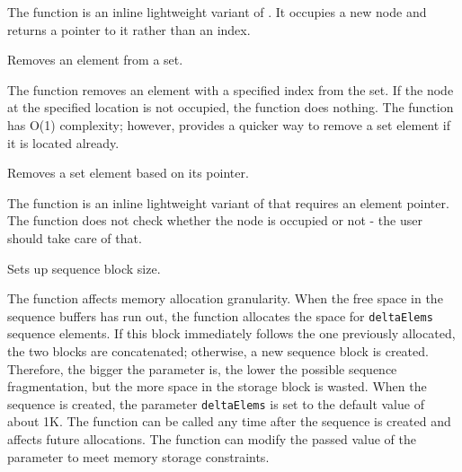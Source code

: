 \begin{description}
\end{description}

The function is an inline lightweight variant of . It occupies a new node and returns a pointer to it rather than an index.


Removes an element from a set.


\begin{description}
\end{description}

The function removes an element with a specified
index from the set. If the node at the specified location is not occupied,
the function does nothing. The function has O(1) complexity; however,
 provides a quicker way to remove a set element
if it is located already.

Removes a set element based on its pointer.


\begin{description}
\end{description}

The function is an inline lightweight variant of  that requires an element pointer. The function does not check whether the node is occupied or not - the user should take care of that.


Sets up sequence block size.


\begin{description}
\end{description}

The function affects memory allocation
granularity. When the free space in the sequence buffers has run out,
the function allocates the space for \texttt{deltaElems} sequence
elements. If this block immediately follows the one previously allocated,
the two blocks are concatenated; otherwise, a new sequence block is
created. Therefore, the bigger the parameter is, the lower the possible
sequence fragmentation, but the more space in the storage block is wasted. When
the sequence is created, the parameter \texttt{deltaElems} is set to
the default value of about 1K. The function can be called any time after
the sequence is created and affects future allocations. The function
can modify the passed value of the parameter to meet memory storage
constraints.

